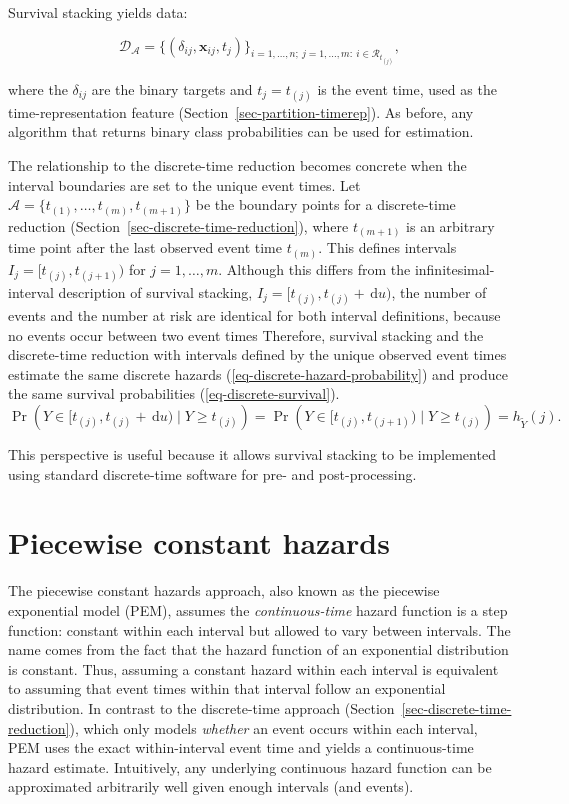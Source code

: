 \documentclass[
  letterpaper,
  krantz2]{style/krantz}
\begin{document}
Survival stacking yields data:

\[
\mathcal{D}_{\mathcal{A}} = \{(\delta_{ij}, \mathbf{x}_{ij}, t_{j})\}_{i=1,\ldots,n;\ j=1,\ldots,m:\ i \in \mathcal{R}_{t_{(j)}}},
\]

where the \(\delta_{ij}\) are the binary targets and \(t_j = t_{(j)}\)
is the event time, used as the time-representation feature
(Section~\ref{sec-partition-timerep}). As before, any algorithm that
returns binary class probabilities can be used for estimation.

The relationship to the discrete-time reduction becomes concrete when
the interval boundaries are set to the unique event times. Let
\(\mathcal{A} = \{t_{(1)}, \ldots, t_{(m)}, t_{(m+1)}\}\) be the
boundary points for a discrete-time reduction
(Section~\ref{sec-discrete-time-reduction}), where \(t_{(m+1)}\) is an
arbitrary time point after the last observed event time \(t_{(m)}\).
This defines intervals \(I_j = [t_{(j)}, t_{(j+1)})\) for
\(j = 1,\ldots,m\). Although this differs from the
infinitesimal-interval description of survival stacking,
\(I_j = [t_{(j)}, t_{(j)}+\,\mathrm{d}u)\), the number of events and the
number at risk are identical for both interval definitions, because no
events occur between two event times Therefore, survival stacking and
the discrete-time reduction with intervals defined by the unique
observed event times estimate the same discrete hazards
(\ref{eq-discrete-hazard-probability}) and produce the same survival
probabilities (\ref{eq-discrete-survival}). \[
\Pr\!\left(Y \in [t_{(j)}, t_{(j)}+\,\mathrm{d}u) \mid Y \geq t_{(j)}\right) = \Pr\!\left(Y \in [t_{(j)}, t_{(j+1)}) \mid Y \geq t_{(j)}\right) = h_{\tilde{Y}}(j).
\]

This perspective is useful because it allows survival stacking to be
implemented using standard discrete-time software for pre- and
post-processing.

\section{Piecewise constant
hazards}\label{sec-piecewise-constant-hazards}

The piecewise constant hazards approach, also known as the piecewise
exponential model (PEM), assumes the \emph{continuous-time} hazard
function is a step function: constant within each interval but allowed
to vary between
intervals.
The name comes from the fact that the hazard function of an exponential
distribution is constant. Thus, assuming a constant hazard within each
interval is equivalent to assuming that event times within that interval
follow an exponential distribution. In contrast to the discrete-time
approach (Section~\ref{sec-discrete-time-reduction}), which only models
\emph{whether} an event occurs within each interval, PEM uses the exact
within-interval event time and yields a continuous-time hazard estimate.
Intuitively, any underlying continuous hazard function can be
approximated arbitrarily well given enough intervals (and events).
\end{document}

